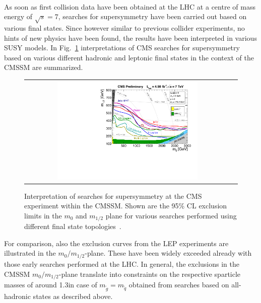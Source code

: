\\
As soon as first collision data have been obtained at the LHC at a centre of mass energy of $\sqrt{s} = 7$\tev, searches for supersymmetry have been carried out based on various final states. Since however similar to previous collider experiments, no hints of new physics have been found, the results have been interpreted in various SUSY models. In Fig.~\ref{fig:CMSSM_7TeV} interpretations of CMS searches for supersymmetry based on various different hadronic and leptonic final states in the context of the CMSSM are summarized. 
\begin{figure}[!tp]
  \centering 
  \begin{tabular}{cc}
    \includegraphics[width=0.7\textwidth]{figures/CMS_SUSY_2011Limits5fb_tanb10.pdf} 
  \end{tabular}
  \caption{Interpretation of searches for supersymmetry at the CMS experiment within the CMSSM. Shown are the 95\% CL exclusion limits in the $m_0$ and $m_{1/2}$ plane for various searches performed using different final state topologies~\cite{bib:CMS:PhysicsResultsSUS}.}
  \label{fig:CMSSM_7TeV}
\end{figure}
For comparison, also the exclusion curves from the LEP experiments are illustrated in the $m_0/m_{1/2}$-plane. These have been widely exceeded already with those early searches performed at the LHC. In general, the exclusions in the CMSSM $m_0/m_{1/2}$-plane translate into constraints on the respective sparticle masses of around 1.3\tev in case of $m_{\tilde{g}} = m_{\tilde{q}}$ obtained from searches based on all-hadronic states as described above.  \\
